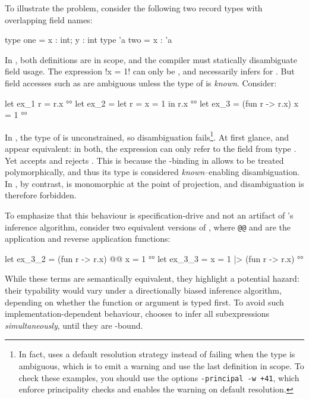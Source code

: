 \documentclass[acmsmall,screen,nonacm,review]{acmart}
\begin{document}
To illustrate the problem, consider the following two record types
with overlapping field names:
\begin{program}[input]
type one = {x : int; y : int}
type 'a two = {x : 'a}
\end{program}
In \OCaml, both definitions are in scope, and the compiler must
statically disambiguate field usage. The expression \ocaml!{x = 1}! can
only be , and  necessarily infers  for .
But field accesses such as  are ambiguous unless the type of  is
\emph{known}. Consider:
\begin{program}[input]
let ex_1 r = r.x                         °°
let ex_2 = let r = {x = 1} in r.x        °°
let ex_3 = (fun r -> r.x) {x = 1}        °°
\end{program}
In , the type of  is unconstrained, so disambiguation
fails\footnote {In fact, \OCaml uses a default
resolution strategy instead of failing when the type is ambiguous,
  which is to emit a warning and use the last definition in scope. To
  check these examples, you should use the options
  \texttt{-principal -w +41}, which enforce principality checks and enables
  the warning on default resolution.}.
\relax
At first glance,  and  appear equivalent: in both,
the expression  can only refer to the field from type .
Yet \OCaml accepts  and rejects .
This is because the -binding in  allows  to be
treated polymorphically, and thus its type is considered \emph{known}--enabling
disambiguation. In , by contrast,  is monomorphic at the point of
projection, and disambiguation is therefore forbidden.

To emphasize that this behaviour is specification-drive and not an
artifact of \OCaml's inference algorithm, consider two equivalent versions of
, where \texttt{@@} and \ocaml{|>} are the application and reverse application
functions:
\begin{program}[input]
let ex_3_2 = (fun r -> r.x) @@ {x = 1}   °°
let ex_3_3 = {x = 1} |> (fun r -> r.x)   °°
\end{program}
While these terms are semantically equivalent, they highlight a potential hazard:
their typability would vary under a directionally biased inference algorithm,
depending on whether the function or argument is typed first.
To avoid such implementation-dependent behaviour, \OCaml chooses to infer
all subexpressions \emph{simultaneously}, until they are -bound.
\end{document}
